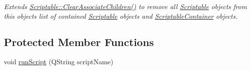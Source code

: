 \begin{DoxyCompactItemize}
\begin{DoxyCompactList}\small\item\em Extends \hyperlink{class_picto_1_1_data_store_a340c4d3fe20a1011002918820893192c}{Scriptable\-::\-Clear\-Associate\-Children()} to remove all \hyperlink{class_picto_1_1_scriptable}{Scriptable} objects from this objects list of contained \hyperlink{class_picto_1_1_scriptable}{Scriptable} objects and \hyperlink{class_picto_1_1_scriptable_container}{Scriptable\-Container} objects. \end{DoxyCompactList}\end{DoxyCompactItemize}
\subsection*{Protected Member Functions}
\begin{DoxyCompactItemize}
\item 
\hypertarget{class_picto_1_1_scriptable_container_a09a80e0a86d216983f258fb4fc78da88}{void \hyperlink{class_picto_1_1_scriptable_container_a09a80e0a86d216983f258fb4fc78da88}{run\-Script} (Q\-String script\-Name)}\label{class_picto_1_1_scriptable_container_a09a80e0a86d216983f258fb4fc78da88}


\end{DoxyCompactItemize}

